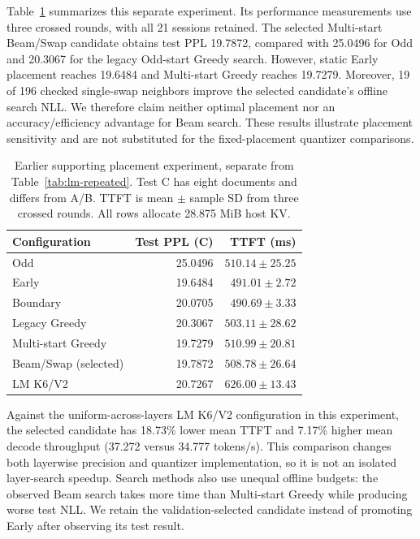 \documentclass[conference,a4paper,10pt]{IEEEtran}
\begin{document}
Table~\ref{tab:allocation} summarizes this separate experiment. Its performance measurements use three crossed rounds, with all 21 sessions retained. The selected Multi-start Beam/Swap candidate obtains test PPL 19.7872, compared with 25.0496 for Odd and 20.3067 for the legacy Odd-start Greedy search. However, static Early placement reaches 19.6484 and Multi-start Greedy reaches 19.7279. Moreover, 19 of 196 checked single-swap neighbors improve the selected candidate's offline search NLL. We therefore claim neither optimal placement nor an accuracy/efficiency advantage for Beam search. These results illustrate placement sensitivity and are not substituted for the fixed-placement quantizer comparisons.

\begin{table}[t]
\caption{Earlier supporting placement experiment, separate from Table~\ref{tab:lm-repeated}. Test C has eight documents and differs from A/B. TTFT is mean $\pm$ sample SD from three crossed rounds. All rows allocate 28.875 MiB host KV.}
\label{tab:allocation}
\centering
\setlength{\tabcolsep}{4pt}
\begin{tabular}{@{}lrr@{}}
\toprule
Configuration & Test PPL (C) & TTFT (ms)\\
\midrule
Odd & 25.0496 & $510.14\pm25.25$\\
Early & 19.6484 & $491.01\pm2.72$\\
Boundary & 20.0705 & $490.69\pm3.33$\\
Legacy Greedy & 20.3067 & $503.11\pm28.62$\\
Multi-start Greedy & 19.7279 & $510.99\pm20.81$\\
Beam/Swap (selected) & 19.7872 & $508.78\pm26.64$\\
LM K6/V2 & 20.7267 & $626.00\pm13.43$\\
\bottomrule
\end{tabular}
\end{table}

Against the uniform-across-layers LM K6/V2 configuration in this experiment, the selected candidate has 18.73\% lower mean TTFT and 7.17\% higher mean decode throughput (37.272 versus 34.777 tokens/s). This comparison changes both layerwise precision and quantizer implementation, so it is not an isolated layer-search speedup. Search methods also use unequal offline budgets: the observed Beam search takes more time than Multi-start Greedy while producing worse test NLL. We retain the validation-selected candidate instead of promoting Early after observing its test result.
\end{document}
